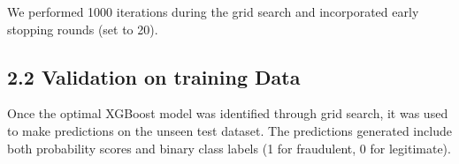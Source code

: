 \documentclass[11pt,twoside,twocolumn]{extarticle}
\begin{document}
We performed 1000 iterations during the grid search and incorporated early stopping rounds (set to 20).

\subsection*{2.2 Validation on training  Data}
Once the optimal XGBoost model was identified through grid search, it was used to make predictions on the unseen test dataset. The predictions generated include both probability scores and binary class labels (1 for fraudulent, 0 for legitimate).

\end{document}
